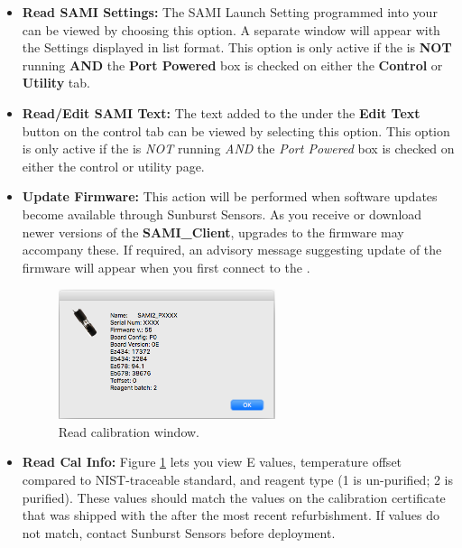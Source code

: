 \begin{itemize}
    \item[] \textbf{Read SAMI Settings:}
    The SAMI Launch Setting programmed into your \instType{} can be viewed by choosing this option. A separate window will appear with the Settings displayed in list format.  This option is only active if the \instType{} is \textbf{NOT} running \textbf{AND} the \textbf{Port Powered} box is checked on either the \textbf{Control} or \textbf{Utility} tab.
    
    \item[] \textbf{Read/Edit SAMI Text:}
    The text added to the \instType{} under the \textbf{Edit Text} button on the control tab can be viewed by selecting this option. This option is only active if the \instType{} is \textit{NOT} running \textit{AND} the \textit{Port Powered} box is checked on either the control or utility page.
    
    \item[] \textbf{Update Firmware:}
    This action will be performed when software updates become available through Sunburst Sensors.  As you receive or download newer versions of the \textbf{SAMI\_Client}, upgrades to the firmware may accompany these.  If required, an advisory message suggesting update of the firmware will appear when you first connect to the \instType{}.
    
    \begin{figure}
    \centering
    \includegraphics[width=0.6\textwidth]{figs/Cal_Info.png}
    \caption{Read calibration window.}
    \label{fig:CalInfo}
    \end{figure}
    
    \item[] \textbf{Read Cal Info:} Figure \ref{fig:CalInfo} lets you view E values, \instType{} temperature offset compared to NIST-traceable standard, and reagent type (1 is un-purified; 2 is purified). These values should match the values on the calibration certificate that was shipped with the \instType{} after the most recent refurbishment.  If values do not match, contact Sunburst Sensors before deployment.
\end{itemize}


